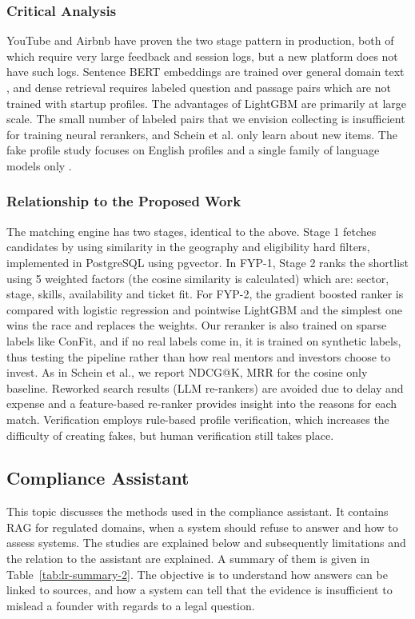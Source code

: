 \documentclass{FastFyp}
\begin{document}
\subsubsection{Critical Analysis}
YouTube and Airbnb have proven the two stage pattern in production, both of which require very large feedback and session logs, but a new platform does not have such logs. Sentence BERT embeddings are trained over general domain text \cite{ref:reimers2019}, and dense retrieval requires labeled question and passage pairs \cite{ref:karpukhin2020} which are not trained with startup profiles. The advantages of LightGBM \cite{ref:ke2017} are primarily at large scale. The small number of labeled pairs that we envision collecting is insufficient for training neural rerankers, and Schein et al. \cite{ref:schein2002} only learn about new items. The fake profile study focuses on English profiles and a single family of language models only \cite{ref:gulati2025}.

\subsubsection{Relationship to the Proposed Work}
The matching engine has two stages, identical to the above. Stage 1 fetches candidates by using similarity in the geography and eligibility hard filters, implemented in PostgreSQL using pgvector. In FYP-1, Stage 2 ranks the shortlist using 5 weighted factors (the cosine similarity is calculated) which are: sector, stage, skills, availability and ticket fit. For FYP-2, the gradient boosted ranker is compared with logistic regression and pointwise LightGBM and the simplest one wins the race and replaces the weights. Our reranker is also trained on sparse labels like ConFit, and if no real labels come in, it is trained on synthetic labels, thus testing the pipeline rather than how real mentors and investors choose to invest. As in Schein et al., we report NDCG@K, MRR for the cosine only baseline. Reworked search results (LLM re-rankers) are avoided due to delay and expense and a feature-based re-ranker provides insight into the reasons for each match. Verification employs rule-based profile verification, which increases the difficulty of creating fakes, but human verification still takes place.

\subsection{Compliance Assistant}\label{sec:lr-eval}
This topic discusses the methods used in the compliance assistant. It contains RAG for regulated domains, when a system should refuse to answer and how to assess systems. The studies are explained below and subsequently limitations and the relation to the assistant are explained. A summary of them is given in Table~\ref{tab:lr-summary-2}. The objective is to understand how answers can be linked to sources, and how a system can tell that the evidence is insufficient to mislead a founder with regards to a legal question.
\end{document}
